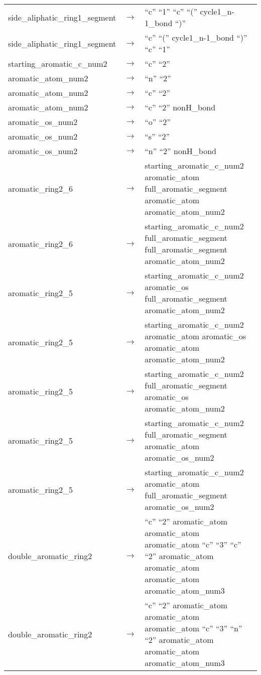 \documentclass[../Document.tex]{subfiles}
\begin{document}
\begin{longtable}{m{} p{} p{}}
    side\_aliphatic\_ring1\_segment & $\rightarrow$ & ``c'' ``1'' ``c'' ``('' cycle1\_n-1\_bond ``)'' \\
    side\_aliphatic\_ring1\_segment & $\rightarrow$ & ``c'' ``('' cycle1\_n-1\_bond ``)'' ``c'' ``1'' \\
    starting\_aromatic\_c\_num2 & $\rightarrow$ & ``c'' ``2'' \\
    aromatic\_atom\_num2 & $\rightarrow$ & ``n'' ``2'' \\
    aromatic\_atom\_num2 & $\rightarrow$ & ``c'' ``2'' \\
    aromatic\_atom\_num2 & $\rightarrow$ & ``c'' ``2'' nonH\_bond \\
    aromatic\_os\_num2 & $\rightarrow$ & ``o'' ``2'' \\
    aromatic\_os\_num2 & $\rightarrow$ & ``s'' ``2'' \\
    aromatic\_os\_num2 & $\rightarrow$ & ``n'' ``2'' nonH\_bond \\
    aromatic\_ring2\_6 & $\rightarrow$ & starting\_aromatic\_c\_num2 aromatic\_atom full\_aromatic\_segment aromatic\_atom aromatic\_atom\_num2 \\
    aromatic\_ring2\_6 & $\rightarrow$ & starting\_aromatic\_c\_num2 full\_aromatic\_segment full\_aromatic\_segment aromatic\_atom\_num2 \\
    aromatic\_ring2\_5 & $\rightarrow$ & starting\_aromatic\_c\_num2 aromatic\_os full\_aromatic\_segment aromatic\_atom\_num2 \\
    aromatic\_ring2\_5 & $\rightarrow$ & starting\_aromatic\_c\_num2 aromatic\_atom aromatic\_os aromatic\_atom aromatic\_atom\_num2 \\
    aromatic\_ring2\_5 & $\rightarrow$ & starting\_aromatic\_c\_num2 full\_aromatic\_segment aromatic\_os aromatic\_atom\_num2 \\
    aromatic\_ring2\_5 & $\rightarrow$ & starting\_aromatic\_c\_num2 full\_aromatic\_segment aromatic\_atom aromatic\_os\_num2 \\
    aromatic\_ring2\_5 & $\rightarrow$ & starting\_aromatic\_c\_num2 aromatic\_atom full\_aromatic\_segment aromatic\_os\_num2 \\
    double\_aromatic\_ring2 & $\rightarrow$ & ``c'' ``2'' aromatic\_atom aromatic\_atom aromatic\_atom ``c'' ``3'' ``c'' ``2'' aromatic\_atom aromatic\_atom aromatic\_atom aromatic\_atom\_num3 \\
    double\_aromatic\_ring2 & $\rightarrow$ & ``c'' ``2'' aromatic\_atom aromatic\_atom aromatic\_atom ``c'' ``3'' ``n'' ``2'' aromatic\_atom aromatic\_atom aromatic\_atom\_num3 \\

\end{longtable}
\end{document}
